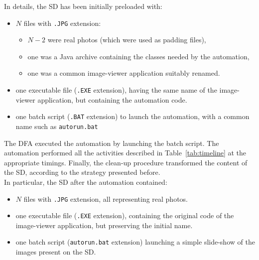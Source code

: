 \documentclass[10pt, conference]{IEEEtran}
\begin{document}
\smallskip

\noindent In details, the SD has been initially preloaded with:
\begin{itemize}
\item $N$ files with \verb=.JPG= extension:
\begin{itemize}
 \item $N-2$ were real photos (which were used as padding files),
 \item one was a Java archive containing the classes needed by the automation,
 \item one was a common image-viewer application suitably renamed.
\end{itemize}
\item one executable file (\verb=.EXE= extension), having the same name of the image-viewer application, but containing the automation code.
\item one batch script (\verb=.BAT= extension) to launch the automation, with a common name such as \verb=autorun.bat=
\end{itemize}

\noindent The DFA executed the automation by launching the batch script. The automation performed all the
activities described in Table~\ref{tab:timeline} at the appropriate timings. Finally, the clean-up procedure transformed
the content of the SD, according to the strategy presented before. \\
\noindent In particular, the SD after the automation contained:

\begin{itemize}
\item $N$ files with \verb=.JPG= extension, all representing real photos.
\item one executable file (\verb=.EXE= extension), containing the original code of the image-viewer application, but preserving the initial name.
\item one batch script (\verb=autorun.bat= extension) launching a simple slide-show of the images present on the SD.
\end{itemize}
  
\end{document}
